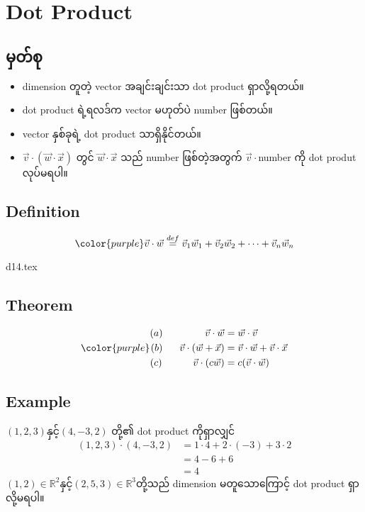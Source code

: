 \section{Dot Product}
\subsection{မှတ်စု}
\begin{itemize}
    \item dimension တူတဲ့ vector အချင်းချင်းသာ dot product ရှာလို့ရတယ်။
    \item dot product ရဲ့ရလဒ်က vector မဟုတ်ပဲ number ဖြစ်တယ်။
    \item vector နှစ်ခုရဲ့ dot product သာရှိနိုင်တယ်။
    \item $\vec{v}\cdot(\vec{w}\cdot\vec{x})$ တွင် $\vec{w}\cdot\vec{x}$ သည် number ဖြစ်တဲ့အတွက် $\vec{v}\cdot$number ကို dot produt လုပ်မရပါ။
\end{itemize}
\subsection{Definition}
\begin{equation}
    {\color{purple} \vec{v}\cdot\vec{w}\stackrel{def}{=}\vec{v}_1\vec{w}_1+\vec{v}_2\vec{w}_2+\dots+\vec{v}_n\vec{w}_n}
    \label{eq:dot-product}
\end{equation}
\begin{center}
    {d14.tex}
\end{center}
\subsection{Theorem}
\begin{equation}
    {\color{purple} \begin{split}
            (a)\hspace{15mm}\vec{v}\cdot\vec{w}          & =\vec{w}\cdot\vec{v}                     \\
            (b)\hspace{6mm}\vec{v}\cdot(\vec{w}+\vec{x}) & =\vec{v}\cdot\vec{w}+\vec{v}\cdot\vec{x} \\
            (c)\hspace{11mm}\vec{v}\cdot(c\vec{w})       & =c(\vec{v}\cdot\vec{w})
        \end{split}}
    \label{eq:dot-product-theorem}
\end{equation}
\subsection{Example}
$(1,2,3)$နှင့်$(4,-3,2)$ တို့၏ dot product ကိုရှာလျှင်
\[
    \begin{split}
        (1,2,3)\cdot(4,-3,2) & =1\cdot4+2\cdot(-3)+3\cdot2 \\
                             & =4-6+6                      \\
                             & =4
    \end{split}
\]
$(1,2)\in\mathbb{R}^2$နှင့်$(2,5,3)\in\mathbb{R}^3$တို့သည် dimension မတူသောကြောင့် dot product ရှာလို့မရပါ။